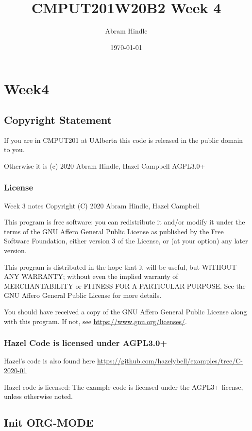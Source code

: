 \documentclass[11pt]{article}
\author{Abram Hindle}
\date{\today}
\title{CMPUT201W20B2 Week 4}
\begin{document}
\maketitle
\tableofcontents


\section{Week4}
\label{sec:orgf0f9dc3}
\subsection{Copyright Statement}
\label{sec:org6309117}

If you are in CMPUT201 at UAlberta this code is released in the public
domain to you.

Otherwise it is (c) 2020 Abram Hindle, Hazel Campbell AGPL3.0+

\subsubsection{License}
\label{sec:org3ec3419}

Week 3 notes
Copyright (C) 2020 Abram Hindle, Hazel Campbell

This program is free software: you can redistribute it and/or modify
it under the terms of the GNU Affero General Public License as
published by the Free Software Foundation, either version 3 of the
License, or (at your option) any later version.

This program is distributed in the hope that it will be useful,
but WITHOUT ANY WARRANTY; without even the implied warranty of
MERCHANTABILITY or FITNESS FOR A PARTICULAR PURPOSE.  See the
GNU Affero General Public License for more details.

You should have received a copy of the GNU Affero General Public License
along with this program.  If not, see \url{https://www.gnu.org/licenses/}.


\subsubsection{Hazel Code is licensed under AGPL3.0+}
\label{sec:orgedf10b4}

Hazel's code is also found here
\url{https://github.com/hazelybell/examples/tree/C-2020-01}

Hazel code is licensed: The example code is licensed under the AGPL3+
license, unless otherwise noted.

\subsection{Init ORG-MODE}
\label{sec:org63caef3}
\end{document}
